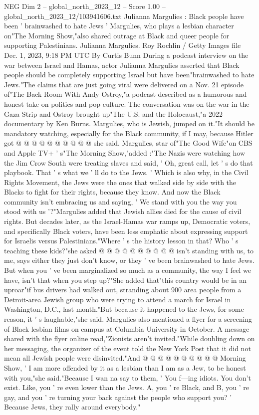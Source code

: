\begin{textsample}{NEG Dim 2 – global\_north\_2023\_12 – Score 1.00 – global\_north\_2023\_12/103941606.txt}  \label{ex:f2_neg_206}
Julianna Margulies : Black people have been ' brainwashed to hate Jews ' Margulies, who plays a lesbian character on"The Morning Show,"also shared outrage at Black and queer people for supporting Palestinians.
Julianna Margulies.
Roy Rochlin / Getty Images file Dec. 1, 2023, 9:18 PM UTC By Curtis Bunn During a podcast interview on the war between Israel and Hamas, actor Julianna Margulies asserted that Black people should be completely supporting Israel but have been"brainwashed to hate Jews."The claims that are just going viral were delivered on a Nov. 21 episode of"The Back Room With Andy Ostroy,"a podcast described as a humorous and honest take on politics and pop culture.
The conversation was on the war in the Gaza Strip and Ostroy brought up"The U.S. and the Holocaust,"a 2022 documentary by Ken Burns.
Margulies, who is Jewish, jumped on it."It should be mandatory watching, especially for the Black community, if I may, because Hitler got @ @ @ @ @ @ @ @ @ @ she said.
Margulies, star of"The Good Wife"on CBS and Apple TV+ ' s"The Morning Show,"added :"The Nazis were watching how the Jim Crow South were treating slaves and said, ' Oh, great call, let ' s do that playbook.
That ' s what we ' ll do to the Jews. ' Which is also why, in the Civil Rights Movement, the Jews were the ones that walked side by side with the Blacks to fight for their rights, because they know.
And now the Black community isn't embracing us and saying, ' We stand with you the way you stood with us '?"Margulies added that Jewish allies died for the cause of civil rights.
But decades later, as the Israel-Hamas war ramps up, Democratic voters, and specifically Black voters, have been less emphatic about expressing support for Israelis versus Palestinians."Where ' s the history lesson in that?
Who ' s teaching these kids?"she asked @ @ @ @ @ @ @ @ @ @ isn't standing with us, to me, says either they just don't know, or they ' ve been brainwashed to hate Jews.
But when you ' ve been marginalized so much as a community, the way I feel we have, isn't that when you step up?"She added that"this country would be in an uproar"if bus drivers had walked out, stranding about 900 area people from a Detroit-area Jewish group who were trying to attend a march for Israel in Washington, D.C., last month."But because it happened to the Jews, for some reason, it ' s laughable,"she said.
Margulies also mentioned a flyer for a screening of Black lesbian films on campus at Columbia University in October.
A message shared with the flyer online read,"Zionists aren't invited."While doubling down on her messaging, the organizer of the event told the New York Post that it did not mean all Jewish people were disinvited."And @ @ @ @ @ @ @ @ @ @ Morning Show, ' I am more offended by it as a lesbian than I am as a Jew, to be honest with you,"she said."Because I wan na say to them, ' You f---ing idiots.
You don't exist.
Like, you ' re even lower than the Jews.
A, you ' re Black, and B, you ' re gay, and you ' re turning your back against the people who support you? ' Because Jews, they rally around everybody."

\end{textsample}
